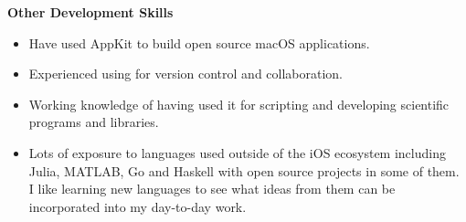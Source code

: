 \textbf{Other Development Skills}
\begin{itemize}[leftmargin=0mm]
\item Have used AppKit to build open source macOS applications.
\item Experienced using  for version control and collaboration.
\item Working knowledge of  having used it for scripting and
  developing scientific programs and libraries.
\item Lots of exposure to languages used outside of the iOS ecosystem including
  Julia, \mbox{MATLAB}, Go and Haskell with open source projects in some of
  them. I like learning new languages to see what ideas from them can be
  incorporated into my day-to-day work.
\end{itemize}

